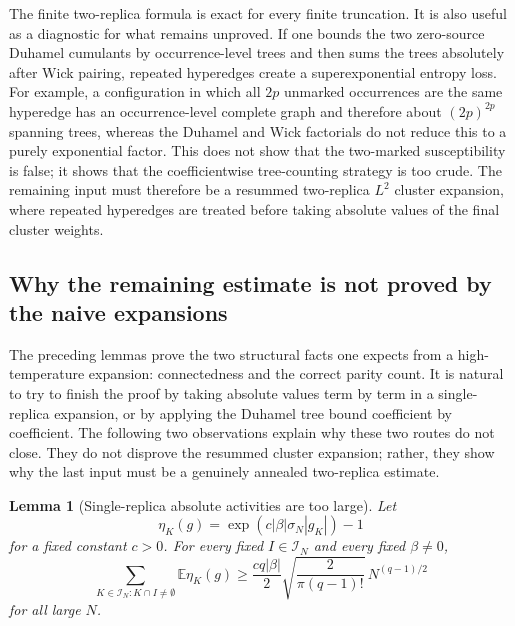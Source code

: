 \documentclass[11pt]{article}
\newtheorem{lemma}[theorem]{Lemma}
\newcommand{\E}{\mathbb{E}}
\newcommand{\calI}{\mathcal{I}}
\begin{document}
The finite two-replica formula is exact for every finite truncation.  It is also
useful as a diagnostic for what remains unproved.  If one bounds the two
zero-source Duhamel cumulants by occurrence-level trees and then sums the trees
absolutely after Wick pairing, repeated hyperedges create a superexponential
entropy loss.  For example, a configuration in which all $2p$ unmarked
occurrences are the same hyperedge has an occurrence-level complete graph and
therefore about $(2p)^{2p}$ spanning trees, whereas the Duhamel and Wick
factorials do not reduce this to a purely exponential factor.  This does not
show that the two-marked susceptibility is false; it shows that the
coefficientwise tree-counting strategy is too crude.  The remaining input must
therefore be a resummed two-replica $L^2$ cluster expansion, where repeated
hyperedges are treated before taking absolute values of the final cluster
weights.


\subsection{Why the remaining estimate is not proved by the naive expansions}
\label{subsec:why-naive-cluster-fails}

The preceding lemmas prove the two structural facts one expects from a
high-temperature expansion: connectedness and the correct parity count.  It is
natural to try to finish the proof by taking absolute values term by term in a
single-replica expansion, or by applying the Duhamel tree bound coefficient by
coefficient.  The following two observations explain why these two routes do
not close.  They do not disprove the resummed cluster expansion; rather, they
show why the last input must be a genuinely annealed two-replica estimate.

\begin{lemma}[Single-replica absolute activities are too large]
  \label{lem:single-replica-activity-fails}
  Let
  \begin{equation}\label{eq:single-activity-def}
    \eta_K(g)=\exp\left(c|\beta|\sigma_N|g_K|\right)-1
  \end{equation}
  for a fixed constant $c>0$.  For every fixed $I\in\calI_N$ and every fixed
  $\beta\neq0$,
  \begin{equation}\label{eq:single-activity-diverges}
    \sum_{K\in\calI_N:K\cap I\neq\emptyset}\E\eta_K(g)
    \geq
    \frac{cq|\beta|}{2}
    \sqrt{\frac{2}{\pi(q-1)!}}\,
    N^{(q-1)/2}
  \end{equation}
  for all large $N$.
\end{lemma}
\end{document}

